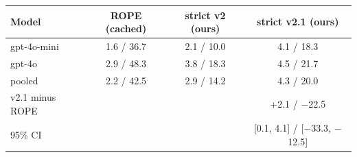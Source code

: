 \begin{tabular}{@{}lccc@{}}
\toprule
Model & ROPE (cached) & \textbf{strict v2 (ours)} & \textbf{strict v2.1 (ours)} \\
\midrule
gpt-4o-mini & 1.6 / 36.7 & 2.1 / 10.0 & 4.1 / 18.3 \\
gpt-4o & 2.9 / 48.3 & 3.8 / 18.3 & 4.5 / 21.7 \\
pooled & 2.2 / 42.5 & 2.9 / 14.2 & 4.3 / 20.0 \\
v2.1 minus ROPE & & & +2.1 / $-$22.5 \\
95\% CI & & & [0.1, 4.1] / [$-$33.3, $-$12.5] \\
\bottomrule
\end{tabular}

